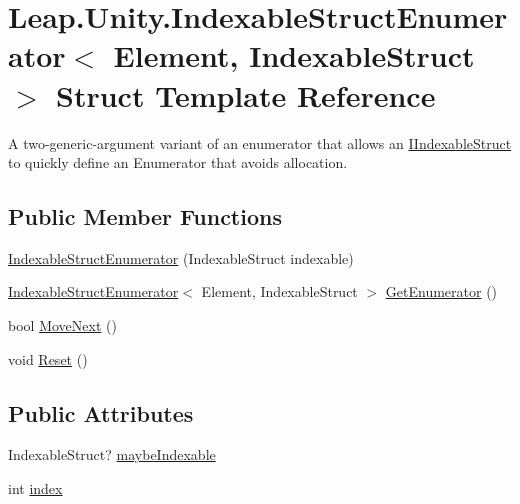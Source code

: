 \hypertarget{struct_leap_1_1_unity_1_1_indexable_struct_enumerator}{}\section{Leap.\+Unity.\+Indexable\+Struct\+Enumerator$<$ Element, Indexable\+Struct $>$ Struct Template Reference}
\label{struct_leap_1_1_unity_1_1_indexable_struct_enumerator}


A two-\/generic-\/argument variant of an enumerator that allows an \mbox{\hyperlink{interface_leap_1_1_unity_1_1_i_indexable_struct}{I\+Indexable\+Struct}} to quickly define an Enumerator that avoids allocation.  


\subsection*{Public Member Functions}
\begin{DoxyCompactItemize}
\item 
\mbox{\hyperlink{struct_leap_1_1_unity_1_1_indexable_struct_enumerator_a21ea023ae2c258a3385ca4c6edf2aafe}{Indexable\+Struct\+Enumerator}} (Indexable\+Struct indexable)
\item 
\mbox{\hyperlink{struct_leap_1_1_unity_1_1_indexable_struct_enumerator}{Indexable\+Struct\+Enumerator}}$<$ Element, Indexable\+Struct $>$ \mbox{\hyperlink{struct_leap_1_1_unity_1_1_indexable_struct_enumerator_a6717ef4019da1f0e2e300a4ac3554cf6}{Get\+Enumerator}} ()
\item 
bool \mbox{\hyperlink{struct_leap_1_1_unity_1_1_indexable_struct_enumerator_afb9220e6b96b49d0328751b479b42507}{Move\+Next}} ()
\item 
void \mbox{\hyperlink{struct_leap_1_1_unity_1_1_indexable_struct_enumerator_ad295e9524fdfe7c9c1ee9f3bddbfc1ff}{Reset}} ()
\end{DoxyCompactItemize}
\subsection*{Public Attributes}
\begin{DoxyCompactItemize}
\item 
Indexable\+Struct? \mbox{\hyperlink{struct_leap_1_1_unity_1_1_indexable_struct_enumerator_a3a63e707032ac24b3ecda42353a0fb3a}{maybe\+Indexable}}
\item 
int \mbox{\hyperlink{struct_leap_1_1_unity_1_1_indexable_struct_enumerator_a64299112a2a9883e2666a90deae02a75}{index}}
\end{DoxyCompactItemize}
